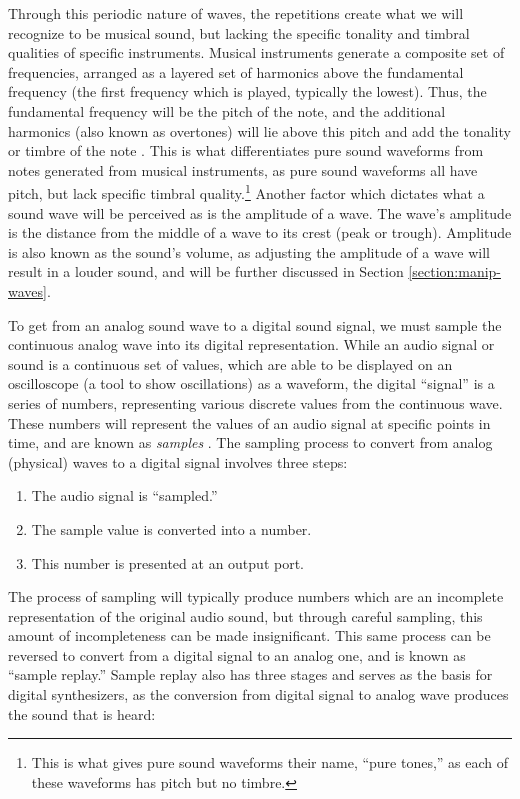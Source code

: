 Through this periodic nature of waves, the repetitions create what we will recognize to be musical sound, but lacking the specific tonality and timbral qualities of specific instruments. Musical instruments generate a composite set of frequencies, arranged as a layered set of harmonics above the fundamental frequency (the first frequency which is played, typically the lowest). Thus, the fundamental frequency will be the pitch of the note, and the additional harmonics (also known as overtones) will lie above this pitch and add the tonality or timbre of the note \cite{Toft_2020}. This is what differentiates pure sound waveforms from notes generated from musical instruments, as pure sound waveforms all have pitch, but lack specific timbral quality.\footnote{This is what gives pure sound waveforms their name, ``pure tones,'' as each of these waveforms has pitch but no timbre.} Another factor which dictates what a sound wave will be perceived as is the amplitude of a wave. The wave's amplitude is the distance from the middle of a wave to its crest (peak or trough). Amplitude is also known as the sound's volume, as adjusting the amplitude of a wave will result in a louder sound, and will be further discussed in Section \ref{section:manip-waves}.

To get from an analog sound wave to a digital sound signal, we must sample the continuous analog wave into its digital representation. While an audio signal or sound is a continuous set of values, which are able to be displayed on an oscilloscope (a tool to show oscillations) as a waveform, the digital ``signal'' is a series of numbers, representing various discrete values from the continuous wave. These numbers will represent the values of an audio signal at specific points in time, and are known as \textit{samples} \cite{Russ_2012}. The sampling process to convert from analog (physical) waves to a digital signal involves three steps:

\begin{enumerate}
	\item The audio signal is ``sampled.''
	\item The sample value is converted into a number.
	\item This number is presented at an output port.
\end{enumerate}

The process of sampling will typically produce numbers which are an incomplete representation of the original audio sound, but through careful sampling, this amount of incompleteness can be made insignificant. This same process can be reversed to convert from a digital signal to an analog one, and is known as ``sample replay.'' Sample replay also has three stages and serves as the basis for digital synthesizers, as the conversion from digital signal to analog wave produces the sound that is heard:

